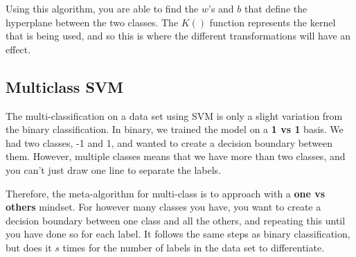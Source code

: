 \documentclass[12pt]{article}
\begin{document}
Using this algorithm, you are able to find the $w$'s and $b$ that define the hyperplane between the two classes. The $K()$ function represents the kernel that is being used, and so this is where the different transformations will have an effect. 

\subsection{Multiclass SVM}
The multi-classification on a data set using SVM is only a slight variation from the binary classification. In binary, we trained the model on a \textbf{1 vs 1} basis. We had two classes, -1 and 1, and wanted to create a decision boundary between them. However, multiple classes means that we have more than two classes, and you can't just draw one line to separate the labels.

Therefore, the meta-algorithm for multi-class is to approach with a \textbf{one vs others} mindset. For however many classes you have, you want to create a decision boundary between one class and all the others, and repeating this until you have done so for each label. It follows the same steps as binary classification, but does it $s$ times for the number of labels in the data set to differentiate. 
\end{document}
